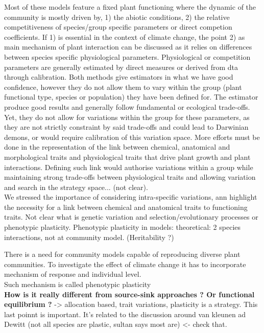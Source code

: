 \documentclass[review]{elsarticle}
\begin{document}
Most of these models feature a fixed plant functioning where the dynamic of the community is mostly driven by, 1) the abiotic conditions, 2) the relative competitiveness of species/group specific parameters or direct competion coefficients. If 1) is essential in the context of climate change, the point 2) as main mechanism of plant interaction can be discussed as it relies on differences between species specific physiological parameters. Physiological or competition parameters are generally estimated by direct measures or derived from dta through calibration. Both methods give estimators in what we have good confidence, however they do not allow them to vary within the group (plant functional type, species or population) they have been defined for. The estimator produce good results and generally follow fundamental or ecological trade-offs. Yet, they do not allow for variations within the group for these parameters, as they are not strictly constraint by said trade-offs and could lead to Darwinian demons, or would require calibration of this variation space. More efforts must be done in the representation of the link  between chemical, anatomical and morphological traits and physiological traits that drive plant growth and plant interactions. Defining such link would authorise variations within a group while maintaining strong trade-offs between physiological traits and allowing variation and search in the strategy space... (not clear).\\

We stressed the importance of considering intra-specific variations, ann highlight the necessity for a link between chemical and anatomical traits to functioning traits.  
 Not clear what is genetic variation and selection/evolutionary processes or phenotypic plasticity. Phenotypic plasticity in models: theoretical: 2 species interactions, not at community model. (Heritability ?)




There is a need for community models capable of reproducing diverse plant communities. To investigate the effect of climate change it has to incorporate mechanism of response and individual level.\\
Such mechanism is called phenotypic plasticity\\

\textbf{
How is it really different from source-sink approaches ? Or functional equilibrium ?}
-> allocation based, trait variations, plasticity is a strategy. This last poinnt is important. It's related to the discussion around van kleunen ad Dewitt (not all species are plastic, sultan says most are) <- check that.\\
\end{document}
